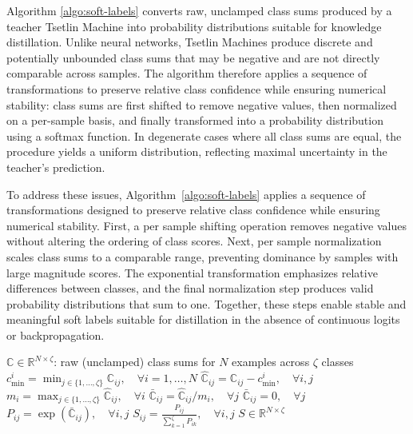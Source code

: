 \documentclass[sn-mathphys-num]{sn-jnl}%
\theoremstyle{thmstyleone}%
\theoremstyle{thmstyletwo}%
\theoremstyle{thmstylethree}%
\begin{document}
Algorithm \ref{algo:soft-labels} converts raw, unclamped class sums produced by a teacher Tsetlin Machine into probability distributions suitable for knowledge distillation. Unlike neural networks, Tsetlin Machines produce discrete and potentially unbounded class sums that may be negative and are not directly comparable across samples. The algorithm therefore applies a sequence of transformations to preserve relative class confidence while ensuring numerical stability: class sums are first shifted to remove negative values, then normalized on a per-sample basis, and finally transformed into a probability distribution using a softmax function. In degenerate cases where all class sums are equal, the procedure yields a uniform distribution, reflecting maximal uncertainty in the teacher’s prediction.

To address these issues, Algorithm~\ref{algo:soft-labels} applies a sequence of transformations designed to preserve relative class confidence while ensuring numerical stability. First, a per sample shifting operation removes negative values without altering the ordering of class scores. Next, per sample normalization scales class sums to a comparable range, preventing dominance by samples with large magnitude scores. The exponential transformation emphasizes relative differences between classes, and the final normalization step produces valid probability distributions that sum to one. Together, these steps enable stable and meaningful soft labels suitable for distillation in the absence of continuous logits or backpropagation.

\begin{algorithm}[h]
	\caption{Generate Soft Labels from Tsetlin Machine Class Sums}
	\label{algo:soft-labels}
	\begin{algorithmic}[1]
		\Require $\mathbb{C} \in \mathbb{R}^{N \times \zeta}$: raw (unclamped) class sums for $N$ examples across $\zeta$ classes
		\State $c_{\min}^i = \min_{j \in \{1,\dots,\zeta\}} \mathbb{C}_{ij}, \quad \forall i = 1,\dots,N$
		\State $\hat{\mathbb{C}}_{ij} = \mathbb{C}_{ij} - c_{\min}^i, \quad \forall i,j$  
		\\
		\State $m_i = \max_{j \in \{1,\dots,\zeta\}} \hat{\mathbb{C}}_{ij}, \quad \forall i$
		\State $\bar{\mathbb{C}}_{ij} = \hat{\mathbb{C}}_{ij} / m_i, \quad \forall j$  
		\Else
		\State $\bar{\mathbb{C}}_{ij} = 0, \quad \forall j$  
		\EndIf
		\\
		\State $P_{ij} = \exp\left(\bar{\mathbb{C}}_{ij} \right), \quad \forall i,j$ 
		\State $S_{ij} = \displaystyle \frac{P_{ij}}{\sum_{k=1}^{\zeta} P_{ik}}, \quad \forall i,j$
		\State \Return $S \in \mathbb{R}^{N \times \zeta}$
		\EndFunction
	\end{algorithmic}
\end{algorithm}
\end{document}
